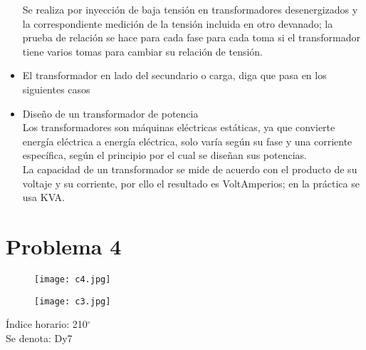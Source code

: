 \documentclass[a4paper,11pt]{article}
\begin{document}
\begin{itemize}
    Se realiza por inyección de baja tensión en transformadores desenergizados y la correspondiente medición de la tensión incluida en otro devanado; la prueba de relación se hace para cada fase para cada toma si el transformador tiene varios tomas para cambiar su relación de tensión.
    \item El transformador en lado del secundario o carga, diga que pasa en los siguientes casos
    \item Diseño de un transformador de potencia\\
    Los transformadores son máquinas eléctricas estáticas, ya que convierte energía eléctrica a energía eléctrica, solo varía según su fase y una corriente específica, según el principio por el cual se diseñan sus potencias.\\
    La capacidad de un transformador se mide de acuerdo con el producto de su voltaje y su corriente, por ello el resultado es VoltAmperios; en la práctica se usa KVA.
\end{itemize}
\section*{Problema 4}
\begin{figure}[H]
    \centering
    \texttt{[image: c4.jpg]}
\end{figure}
\begin{figure}[H]
    \centering
    \texttt{[image: c3.jpg]}
\end{figure}
Índice horario: 210$^{\circ}$\\
Se denota: Dy7
\end{document}
